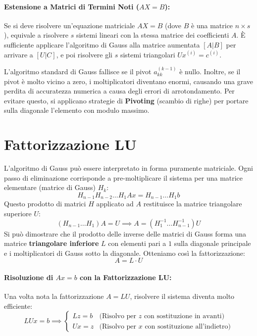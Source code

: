 \documentclass[a4paper,12pt]{article}
\begin{document}
	\paragraph{Estensione a Matrici di Termini Noti ($AX = B$):}
	Se si deve risolvere un'equazione matriciale $AX = B$ (dove $B$ è una matrice $n \times s$), equivale a risolvere $s$ sistemi lineari con la stessa matrice dei coefficienti $A$. È sufficiente applicare l'algoritmo di Gauss alla matrice aumentata $[A | B]$ per arrivare a $[U | C]$, e poi risolvere gli $s$ sistemi triangolari $U x^{(i)} = c^{(i)}$.
	
	\begin{tcolorbox}[title=Nota sul Pivoting, colback=yellow!5!white, colframe=yellow!50!black]
		L'algoritmo standard di Gauss fallisce se il pivot $a_{kk}^{(k-1)}$ è nullo. Inoltre, se il pivot è molto vicino a zero, i moltiplicatori diventano enormi, causando una grave perdita di accuratezza numerica a causa degli errori di arrotondamento. Per evitare questo, si applicano strategie di \textbf{Pivoting} (scambio di righe) per portare sulla diagonale l'elemento con modulo massimo.
	\end{tcolorbox}
	
	\section{Fattorizzazione LU}
	
	L'algoritmo di Gauss può essere interpretato in forma puramente matriciale. Ogni passo di eliminazione corrisponde a pre-moltiplicare il sistema per una matrice elementare (matrice di Gauss) $H_k$:
	\[
	H_{n-1} H_{n-2} \dots H_1 A x = H_{n-1} \dots H_1 b
	\]
	Questo prodotto di matrici $H$ applicato ad $A$ restituisce la matrice triangolare superiore $U$:
	\[
	(H_{n-1} \dots H_1) A = U \implies A = (H_1^{-1} \dots H_{n-1}^{-1}) U
	\]
	Si può dimostrare che il prodotto delle inverse delle matrici di Gauss forma una matrice \textbf{triangolare inferiore} $L$ con elementi pari a $1$ sulla diagonale principale e i moltiplicatori di Gauss sotto la diagonale. 
	Otteniamo così la fattorizzazione:
	\begin{equation}
		A = L \cdot U
	\end{equation}
	
	\paragraph{Risoluzione di $Ax = b$ con la Fattorizzazione LU:}
	Una volta nota la fattorizzazione $A = LU$, risolvere il sistema diventa molto efficiente:
	\begin{equation}
		LUx = b \implies 
		\begin{cases}
			Lz = b & \text{(Risolvo per } z \text{ con sostituzione in avanti)} \\
			Ux = z & \text{(Risolvo per } x \text{ con sostituzione all'indietro)}
		\end{cases}
	\end{equation}
	
\end{document}
